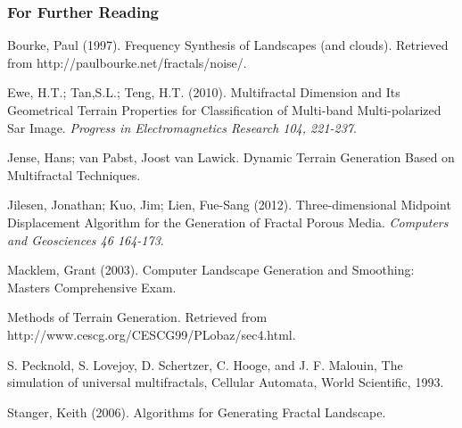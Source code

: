 \documentclass{beamer}
\begin{document}
\begin{frame}[shrink=30]
  \frametitle{For Further Reading}
  
Bourke, Paul (1997). Frequency Synthesis of Landscapes (and clouds). Retrieved from http://paulbourke.net/fractals/noise/.
 
 Ewe, H.T.; Tan,S.L.; Teng, H.T. (2010). Multifractal Dimension and Its Geometrical Terrain Properties for Classification of Multi-band Multi-polarized Sar Image. \emph{Progress in Electromagnetics Research 104, 221-237}.
 
 Jense, Hans; van Pabst, Joost van Lawick. Dynamic Terrain Generation Based on Multifractal Techniques. 
 
 Jilesen, Jonathan; Kuo, Jim; Lien, Fue-Sang (2012). Three-dimensional Midpoint Displacement Algorithm for the Generation of Fractal Porous Media. \emph{Computers and Geosciences 46 164-173}.
 
 Macklem, Grant (2003). Computer Landscape Generation and Smoothing: Masters Comprehensive Exam.
   
Methods of Terrain Generation. Retrieved from http://www.cescg.org/CESCG99/PLobaz/sec4.html.

S. Pecknold, S. Lovejoy, D. Schertzer, C. Hooge, and J. F. Malouin, The simulation of universal multifractals, Cellular Automata, World Scientific, 1993.

Stanger, Keith (2006). Algorithms for Generating Fractal Landscape.

    
    

 
    




\end{frame}
\end{document}
